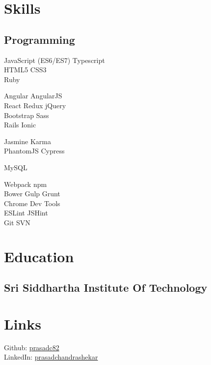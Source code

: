 \documentclass[]{my-resume-openfont}
\begin{document}
\begin{minipage}[t]{0.33\textwidth} 


\section{Skills}
\subsection{Programming}
JavaScript (ES6/ES7) \textbullet{} Typescript \\
HTML5 \textbullet{} CSS3 \\
Ruby
\sectionsep

Angular \textbullet{} AngularJS  \\ 
React \textbullet{} Redux \textbullet{} jQuery \\ 
Bootstrap \textbullet{} Sass \\
Rails \textbullet{} Ionic
\sectionsep

Jasmine \textbullet{} Karma \\
PhantomJS \textbullet{} Cypress
\sectionsep

MySQL 
\sectionsep

Webpack \textbullet{} npm \\
Bower  \textbullet{} Gulp \textbullet{} Grunt \\
Chrome Dev Tools  \\
ESLint \textbullet{} JSHint  \\
Git \textbullet{} SVN 
\sectionsep



\section{Education}

\subsection{Sri Siddhartha Institute Of Technology}
\sectionsep


\section{Links}
Github: \href{https://github.com/prasadc82}{prasadc82} \\
LinkedIn: \href{https://www.linkedin.com/in/prasadchandrashekar}{prasadchandrashekar} \\
\sectionsep

%
%

\end{minipage}
\end{document}
